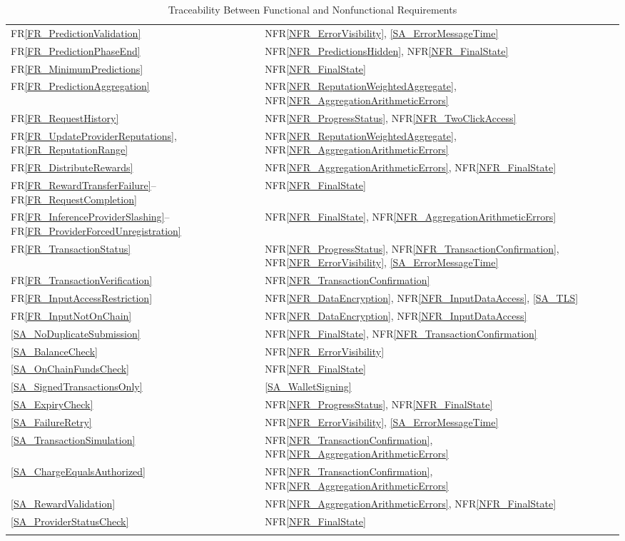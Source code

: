 \documentclass[12pt]{article}
\newcommand{\rref}[1]{FR\ref{#1}}
\newcommand{\nfrref}[1]{NFR\ref{#1}}
\begin{document}
\begin{longtable}{p{} p{}}
\rref{FR_PredictionValidation} & \nfrref{NFR_ErrorVisibility}, \ref{SA_ErrorMessageTime} \\
\rref{FR_PredictionPhaseEnd} & \nfrref{NFR_PredictionsHidden}, \nfrref{NFR_FinalState} \\
\rref{FR_MinimumPredictions} & \nfrref{NFR_FinalState} \\
\rref{FR_PredictionAggregation} & \nfrref{NFR_ReputationWeightedAggregate}, \nfrref{NFR_AggregationArithmeticErrors} \\
\rref{FR_RequestHistory} & \nfrref{NFR_ProgressStatus}, \nfrref{NFR_TwoClickAccess} \\
\rref{FR_UpdateProviderReputations}, \rref{FR_ReputationRange} & \nfrref{NFR_ReputationWeightedAggregate}, \nfrref{NFR_AggregationArithmeticErrors} \\
\rref{FR_DistributeRewards} & \nfrref{NFR_AggregationArithmeticErrors}, \nfrref{NFR_FinalState} \\
\rref{FR_RewardTransferFailure}--\rref{FR_RequestCompletion} & \nfrref{NFR_FinalState} \\
\rref{FR_InferenceProviderSlashing}--\rref{FR_ProviderForcedUnregistration} & \nfrref{NFR_FinalState}, \nfrref{NFR_AggregationArithmeticErrors} \\
\rref{FR_TransactionStatus} & \nfrref{NFR_ProgressStatus}, \nfrref{NFR_TransactionConfirmation}, \nfrref{NFR_ErrorVisibility}, \ref{SA_ErrorMessageTime} \\
\rref{FR_TransactionVerification} & \nfrref{NFR_TransactionConfirmation} \\
\rref{FR_InputAccessRestriction} & \nfrref{NFR_DataEncryption}, \nfrref{NFR_InputDataAccess}, \ref{SA_TLS} \\
\rref{FR_InputNotOnChain} & \nfrref{NFR_DataEncryption}, \nfrref{NFR_InputDataAccess} \\
\midrule
\ref{SA_NoDuplicateSubmission} & \nfrref{NFR_FinalState}, \nfrref{NFR_TransactionConfirmation} \\
\ref{SA_BalanceCheck} & \nfrref{NFR_ErrorVisibility} \\
\ref{SA_OnChainFundsCheck} & \nfrref{NFR_FinalState} \\
\ref{SA_SignedTransactionsOnly} & \ref{SA_WalletSigning} \\
\ref{SA_ExpiryCheck} & \nfrref{NFR_ProgressStatus}, \nfrref{NFR_FinalState} \\
\ref{SA_FailureRetry} & \nfrref{NFR_ErrorVisibility}, \ref{SA_ErrorMessageTime} \\
\ref{SA_TransactionSimulation} & \nfrref{NFR_TransactionConfirmation}, \nfrref{NFR_AggregationArithmeticErrors} \\
\ref{SA_ChargeEqualsAuthorized} & \nfrref{NFR_TransactionConfirmation}, \nfrref{NFR_AggregationArithmeticErrors} \\
\ref{SA_RewardValidation} & \nfrref{NFR_AggregationArithmeticErrors}, \nfrref{NFR_FinalState} \\
\ref{SA_ProviderStatusCheck} & \nfrref{NFR_FinalState} \\
\bottomrule
\caption{Traceability Between Functional and Nonfunctional Requirements}
\label{tab:FR2Rtm}


\end{longtable}
\end{document}
